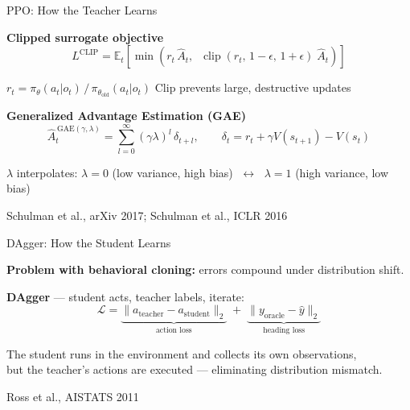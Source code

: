 \documentclass[aspectratio=169,10pt]{beamer}
\newcommand{\source}[1]{\vfill{\tiny\color{gray}#1\par}}
\newcommand{\E}{\mathbb{E}}
\DeclareMathOperator{\clip}{clip}
\begin{document}
\begin{frame}{PPO: How the Teacher Learns}

\textbf{Clipped surrogate objective}
\[
  L^{\mathrm{CLIP}} = \E_t\!\left[\min\!\left(
    r_t\,\hat{A}_t,\;\;
    \clip(r_t,\, 1{-}\epsilon,\, 1{+}\epsilon)\;\hat{A}_t
  \right)\right]
\]

\vspace{4pt}
{\small $r_t = \pi_\theta(a_t|o_t)\,/\,\pi_{\theta_\mathrm{old}}(a_t|o_t)$ \hfill
Clip prevents large, destructive updates}

\vspace{14pt}

\textbf{Generalized Advantage Estimation (GAE)}
\[
  \hat{A}_t^{\,\mathrm{GAE}(\gamma,\lambda)}
  = \sum_{l=0}^{\infty} (\gamma\lambda)^l\,\delta_{t+l},
  \qquad
  \delta_t = r_t + \gamma V(s_{t+1}) - V(s_t)
\]

\vspace{4pt}
{\small $\lambda$ interpolates: $\lambda{=}0$ (low variance, high bias)
$\;\leftrightarrow\;$ $\lambda{=}1$ (high variance, low bias)}

\source{Schulman et al., arXiv 2017; Schulman et al., ICLR 2016}
\end{frame}

\begin{frame}{DAgger: How the Student Learns}

\textbf{Problem with behavioral cloning:} errors compound under
distribution shift.

\vspace{10pt}

\textbf{DAgger} --- student acts, teacher labels, iterate:
\[
  \mathcal{L} =
  \underbrace{\|a_\mathrm{teacher} - a_\mathrm{student}\|_2}_{\text{action loss}}
  \;+\;
  \underbrace{\|y_\mathrm{oracle} - \hat{y}\|_2}_{\text{heading loss}}
\]

\vspace{10pt}

{\small The student runs in the environment and collects its own observations,\\
but the teacher's actions are executed --- eliminating distribution mismatch.}

\source{Ross et al., AISTATS 2011}
\end{frame}
\end{document}
